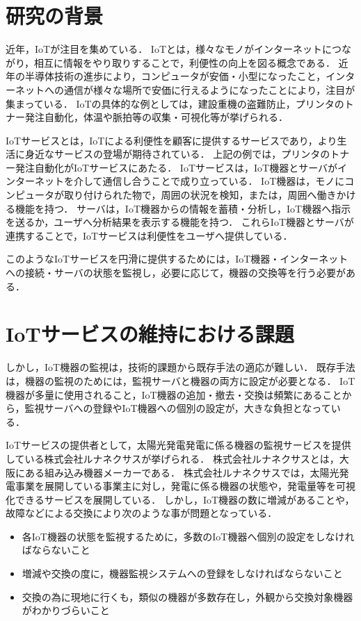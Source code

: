 \section{研究の背景}
近年，IoTが注目を集めている．
IoTとは，様々なモノがインターネットにつながり，相互に情報をやり取りすることで，利便性の向上を図る概念である．
近年の半導体技術の進歩により，コンピュータが安価・小型になったこと，インターネットへの通信が様々な場所で安価に行えるようになったことにより，注目が集まっている．
IoTの具体的な例としては，建設重機の盗難防止，プリンタのトナー発注自動化，体温や脈拍等の収集・可視化等が挙げられる．
\medskip

IoTサービスとは，IoTによる利便性を顧客に提供するサービスであり，より生活に身近なサービスの登場が期待されている．
上記の例では，プリンタのトナー発注自動化がIoTサービスにあたる．
IoTサービスは，IoT機器とサーバがインターネットを介して通信し合うことで成り立っている．
IoT機器は，モノにコンピュータが取り付けられた物で，周囲の状況を検知，または，周囲へ働きかける機能を持つ．
サーバは，IoT機器からの情報を蓄積・分析し，IoT機器へ指示を送るか，ユーザへ分析結果を表示する機能を持つ．
これらIoT機器とサーバが連携することで，IoTサービスは利便性をユーザへ提供している．
\medskip

このようなIoTサービスを円滑に提供するためには，IoT機器・インターネットへの接続・サーバの状態を監視し，必要に応じて，機器の交換等を行う必要がある．

\section{IoTサービスの維持における課題}
しかし，IoT機器の監視は，技術的課題から既存手法の適応が難しい．
既存手法は，機器の監視のためには，監視サーバと機器の両方に設定が必要となる．
IoT機器が多量に使用されること，IoT機器の追加・撤去・交換は頻繁にあることから，監視サーバへの登録やIoT機器への個別の設定が，大きな負担となっている．
\medskip

IoTサービスの提供者として，太陽光発電発電に係る機器の監視サービスを提供している株式会社ルナネクサスが挙げられる．
株式会社ルナネクサスとは，大阪にある組み込み機器メーカーである．
株式会社ルナネクサスでは，太陽光発電事業を展開している事業主に対し，発電に係る機器の状態や，発電量等を可視化できるサービスを展開している．
しかし，IoT機器の数に増減があることや，故障などによる交換により次のような事が問題となっている．
\begin{itemize}
\item 各IoT機器の状態を監視するために，多数のIoT機器へ個別の設定をしなければならないこと
\item 増減や交換の度に，機器監視システムへの登録をしなければならないこと
\item 交換の為に現地に行くも，類似の機器が多数存在し，外観から交換対象機器がわかりづらいこと
\end{itemize}

